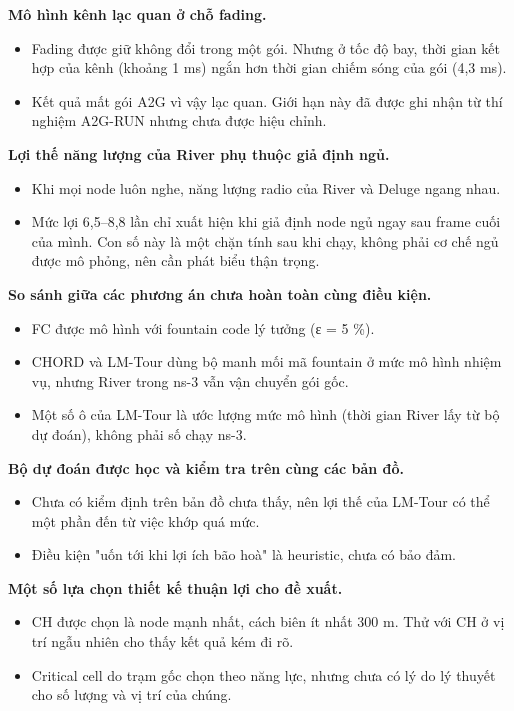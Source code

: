 \textbf{Mô hình kênh lạc quan ở chỗ fading.}

\begin{itemize}
\tightlist
\item
  Fading được giữ không đổi trong một gói. Nhưng ở tốc độ bay, thời gian
  kết hợp của kênh (khoảng 1 ms) ngắn hơn thời gian chiếm sóng của gói
  (4,3 ms).
\item
  Kết quả mất gói A2G vì vậy lạc quan. Giới hạn này đã được ghi nhận từ
  thí nghiệm A2G-RUN nhưng chưa được hiệu chỉnh.
\end{itemize}

\textbf{Lợi thế năng lượng của River phụ thuộc giả định ngủ.}

\begin{itemize}
\tightlist
\item
  Khi mọi node luôn nghe, năng lượng radio của River và Deluge ngang
  nhau.
\item
  Mức lợi 6,5--8,8 lần chỉ xuất hiện khi giả định node ngủ ngay sau
  frame cuối của mình. Con số này là một chặn tính sau khi chạy, không
  phải cơ chế ngủ được mô phỏng, nên cần phát biểu thận trọng.
\end{itemize}

\textbf{So sánh giữa các phương án chưa hoàn toàn cùng điều kiện.}

\begin{itemize}
\tightlist
\item
  FC được mô hình với fountain code lý tưởng (ε = 5 \%).
\item
  CHORD và LM-Tour dùng bộ manh mối mã fountain ở mức mô hình nhiệm vụ,
  nhưng River trong ns-3 vẫn vận chuyển gói gốc.
\item
  Một số ô của LM-Tour là ước lượng mức mô hình (thời gian River lấy từ
  bộ dự đoán), không phải số chạy ns-3.
\end{itemize}

\textbf{Bộ dự đoán được học và kiểm tra trên cùng các bản đồ.}

\begin{itemize}
\tightlist
\item
  Chưa có kiểm định trên bản đồ chưa thấy, nên lợi thế của LM-Tour có
  thể một phần đến từ việc khớp quá mức.
\item
  Điều kiện "uốn tới khi lợi ích bão hoà" là heuristic, chưa có bảo đảm.
\end{itemize}

\textbf{Một số lựa chọn thiết kế thuận lợi cho đề xuất.}

\begin{itemize}
\tightlist
\item
  CH được chọn là node mạnh nhất, cách biên ít nhất 300 m. Thử với CH ở
  vị trí ngẫu nhiên cho thấy kết quả kém đi rõ.
\item
  Critical cell do trạm gốc chọn theo năng lực, nhưng chưa có lý do lý
  thuyết cho số lượng và vị trí của chúng.
\end{itemize}

